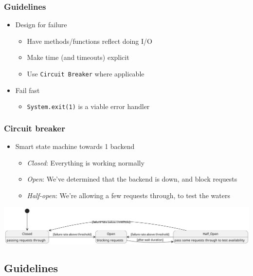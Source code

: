 \documentclass[8pt]{article}
\begin{document}
\subsubsection{Guidelines}
\label{sec:orge7c9762}
\begin{itemize}
\item Design for failure
\begin{itemize}
\item Have methods/functions reflect doing I/O
\item Make time (and timeouts) explicit
\item Use \texttt{Circuit Breaker} where applicable
\end{itemize}
\item Fail fast
\begin{itemize}
\item \texttt{System.exit(1)} is a viable error handler
\end{itemize}
\end{itemize}
\subsubsection{Circuit breaker}
\label{sec:org7d162f4}
\begin{itemize}
\item Smart state machine towards 1 backend
\begin{itemize}
\item \emph{Closed}: Everything is working normally
\item \emph{Open}: We've determined that the backend is down, and block requests
\item \emph{Half-open}: We're allowing a few requests through, to test the waters
\end{itemize}
\end{itemize}

\begin{center}
\includegraphics[width=.9\linewidth]{graphics/circuit-breaker-state.png}
\end{center}

\subsection{Guidelines}
\label{sec:org085f10a}
\end{document}
